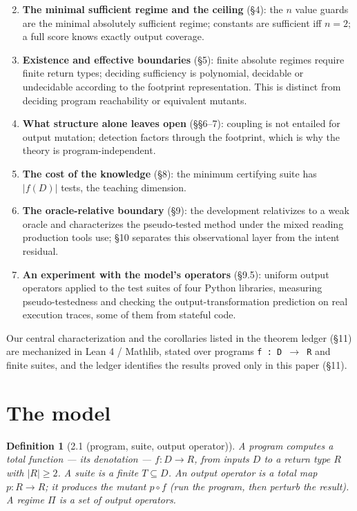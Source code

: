 \documentclass[conference]{IEEEtran}
\theoremstyle{run}
\newtheorem*{definition}{Definition}
\begin{document}
\begin{enumerate}
\setcounter{enumi}{1}
\item \textbf{The minimal sufficient regime and the ceiling} (\S 4): the $n$ value guards are the minimal absolutely sufficient regime; constants are sufficient iff $n = 2$; a full score knows exactly output coverage.
\item \textbf{Existence and effective boundaries} (\S 5): finite absolute regimes require finite return types; deciding sufficiency is polynomial, decidable or undecidable according to the footprint representation. This is distinct from deciding program reachability or equivalent mutants.
\item \textbf{What structure alone leaves open} (\S \S 6--7): coupling is not entailed for output mutation; detection factors through the footprint, which is why the theory is program-independent.
\item \textbf{The cost of the knowledge} (\S 8): the minimum certifying suite has $|f(D)|$ tests, the teaching dimension.
\item \textbf{The oracle-relative boundary} (\S 9): the development relativizes to a weak oracle and characterizes the pseudo-tested method under the mixed reading production tools use; \S 10 separates this observational layer from the intent residual.
\item \textbf{An experiment with the model's operators} (\S 9.5): uniform output operators applied to the test suites of four Python libraries, measuring pseudo-testedness and checking the output-transformation prediction on real execution traces, some of them from stateful code.
\end{enumerate}

Our central characterization and the corollaries listed in the theorem ledger (\S 11) are mechanized in Lean 4 / Mathlib, stated over programs \texttt{f : D \ensuremath{\to} R} and finite suites, and the ledger identifies the results proved only in this paper (\S 11).

\setcounter{section}{1}
\section{The model}
\begin{definition}[2.1 (program, suite, output operator)]
A program computes a total function --- its \emph{denotation} --- $f : D \to R$, from inputs $D$ to a return type $R$ with $|R| \ge 2$. A \emph{suite} is a finite $T \subseteq D$. An \emph{output operator} is a total map $p : R \to R$; it produces the mutant $p \circ f$ (run the program, then perturb the result). A \emph{regime} $\Pi$ is a set of output operators.
\end{definition}
\end{document}
